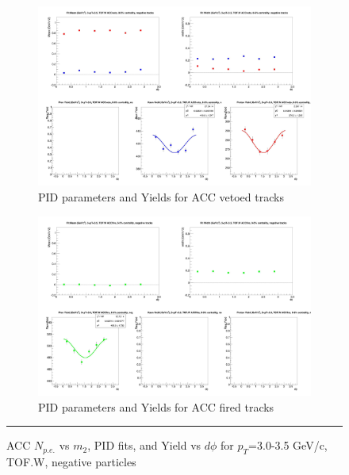 \begin{figure}[H]
  \ContinuedFloat
    \begin{subfigure}{1\textwidth}
    \includegraphics[width=1\textwidth]{hiptfits/neg/fitParams_tof2_cent0_ch0_pT-30-35.jpg}
    \caption{PID parameters and Yields for ACC vetoed tracks}
    \end{subfigure}    
    \begin{subfigure}{1\textwidth}
    \includegraphics[width=1\textwidth]{hiptfits/neg/fitParams_tof3_cent0_ch0_pT-30-35.jpg}
    \caption{PID parameters and Yields for ACC fired tracks}
    \end{subfigure} 
    \rule{35em}{0.5pt}
  \caption[ACC $N_{p.e.}$ vs $m_2$, PID fits, and Yield vs $d\phi$ for $p_T$=3.0-3.5 GeV/c, TOF.W, negative particles]{ACC $N_{p.e.}$ vs $m_2$, PID fits, and Yield vs $d\phi$ for $p_T$=3.0-3.5 GeV/c, TOF.W, negative particles}
  \label{fig:acc30-35neg}
\end{figure}


